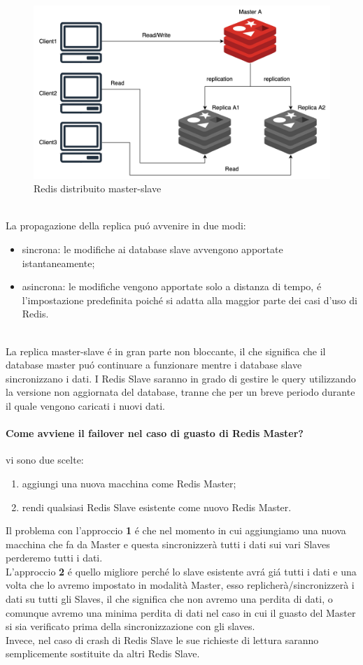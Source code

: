 \begin{figure}[H]
\includegraphics[width=1\textwidth]{img/masterslaveRedis}
\caption{Redis distribuito master-slave}
\end{figure}
\\
La propagazione della replica puó avvenire in due modi:
\begin{itemize}
    \item sincrona: le modifiche ai database slave avvengono apportate istantaneamente;
    \item asincrona: le modifiche vengono apportate solo a distanza di tempo, é l'impostazione predefinita poiché si adatta
    alla maggior parte dei casi d'uso di Redis.
\end{itemize}
\\
La replica master-slave é in gran parte non bloccante, il che significa che il database master puó continuare a funzionare
mentre i database slave sincronizzano i dati.
I Redis Slave saranno in grado di gestire le query utilizzando la versione non aggiornata del database, tranne che per un breve
periodo durante il quale vengono caricati i nuovi dati.

\paragraph{Come avviene il failover nel caso di guasto di Redis Master?\\}
vi sono due scelte:
\begin{enumerate}
    \item aggiungi una nuova macchina come Redis Master;
    \item rendi qualsiasi Redis Slave esistente come nuovo Redis Master.
\end{enumerate}
Il problema con l'approccio \textbf{1} é che nel momento in cui aggiungiamo una nuova macchina che fa da Master e questa sincronizzerà
tutti i dati sui vari Slaves perderemo tutti i dati.\\
L'approccio \textbf{2} é quello migliore perché lo slave esistente avrá giá tutti i dati e una volta che lo avremo impostato in modalità
Master, esso replicherà/sincronizzerà i dati su tutti gli Slaves, il che significa che non avremo una perdita di dati, o comunque
avremo una minima perdita di dati nel caso in cui il guasto del Master si sia verificato prima della sincronizzazione con gli slaves.
\\
Invece, nel caso di crash di Redis Slave le sue richieste di lettura saranno semplicemente sostituite da altri Redis Slave.

